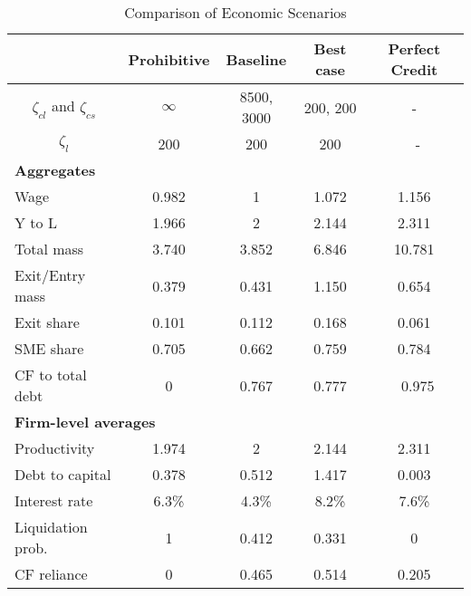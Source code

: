 \documentclass[12pt]{article}
\begin{document}
\begin{table}[h!]
    \centering
    \begin{tabular}{lcccc}
    & \textbf{Prohibitive} & \textbf{Baseline} & \textbf{Best case} & \textbf{Perfect Credit} \\
    \toprule
    \multicolumn{1}{c}{$\zeta_{cl}$ and $\zeta_{cs}$} & $\infty$ & 8500, 3000 & 200, 200 & - \\
    \multicolumn{1}{c}{$\zeta_l$} & 200 & 200 & 200 & \ - \vspace{3mm} \\
    \multicolumn{5}{l}{\textbf{Aggregates}} \\ \hline
    Wage & 0.982 & 1 & 1.072 & 1.156 \\
    Y to L & 1.966 & 2 & 2.144 & 2.311 \\
    Total mass & 3.740 & 3.852 & 6.846 & 10.781 \\
    Exit/Entry mass & 0.379 & 0.431 & 1.150 & 0.654 \\
    Exit share & 0.101 & 0.112 & 0.168 & 0.061 \\
    SME share & 0.705 & 0.662 & 0.759 & 0.784 \\
    CF to total debt & 0 & 0.767 & 0.777 &  \ 0.975 \vspace{3mm} \\
    \multicolumn{5}{l}{\textbf{Firm-level averages}} \\ \hline
    Productivity & 1.974 & 2 & 2.144 & 2.311 \\
    Debt to capital & 0.378 & 0.512 & 1.417 & 0.003 \\
    Interest rate & 6.3\% & 4.3\% & 8.2\% & 7.6\% \\
    Liquidation prob. & 1 & 0.412 & 0.331 & 0 \\
    CF reliance & 0 & 0.465 & 0.514 & 0.205 \\
    \bottomrule
    \end{tabular}
    \caption{Comparison of Economic Scenarios}
    \label{tab:SSvalues}
\end{table}
\end{document}
